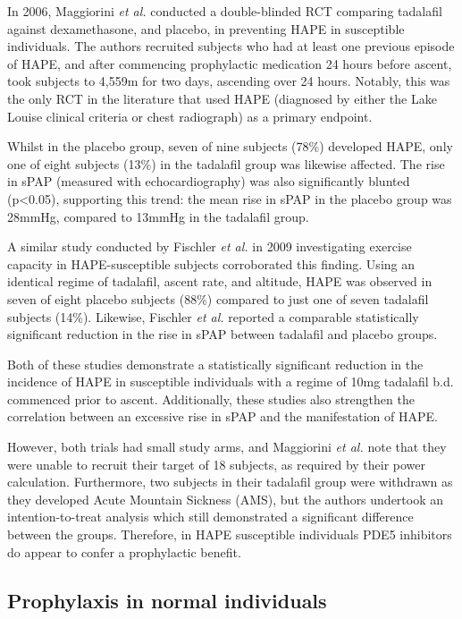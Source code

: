 \documentclass[12pt,a4paper]{article}
\begin{document}
In 2006, Maggiorini \emph{et al.} conducted a double-blinded RCT comparing tadalafil against dexamethasone, and placebo, in preventing HAPE in susceptible individuals.\cite{Maggiorini:2006kz} The authors recruited subjects who had at least one previous episode of HAPE, and after commencing prophylactic medication 24 hours before ascent, took subjects to 4,559m for two days, ascending over 24 hours. Notably, this was the only RCT in the literature that used HAPE (diagnosed by either the Lake Louise clinical criteria\cite{Sutton:1991wx} or chest radiograph) as a primary endpoint.

Whilst in the placebo group, seven of nine subjects (78\%) developed HAPE, only one of eight subjects (13\%) in the tadalafil group was likewise affected. The rise in sPAP (measured with echocardiography) was also significantly blunted (p<0.05), supporting this trend: the mean rise in sPAP in the placebo group was 28mmHg, compared to 13mmHg in the tadalafil group.\cite{Maggiorini:2006kz}

A similar study conducted by Fischler \emph{et al.} in 2009 investigating exercise capacity in HAPE-susceptible subjects corroborated this finding. Using an identical regime of tadalafil, ascent rate, and altitude, HAPE was observed in seven of eight placebo subjects (88\%) compared to just one of seven tadalafil subjects (14\%). Likewise, Fischler \emph{et al.} reported a comparable statistically significant reduction in the rise in sPAP between tadalafil and placebo groups.\cite{Fischler:2009ce}

Both of these studies demonstrate a statistically significant reduction in the incidence of HAPE in susceptible individuals with a regime of 10mg tadalafil b.d. commenced prior to ascent. Additionally, these studies also strengthen the correlation between an excessive rise in sPAP and the manifestation of HAPE.

However, both trials had small study arms, and Maggiorini \emph{et al.} note that they were unable to recruit their target of 18 subjects, as required by their power calculation. Furthermore, two subjects in their tadalafil group were withdrawn as they developed Acute Mountain Sickness (AMS), but the authors undertook an intention-to-treat analysis which still demonstrated a significant difference between the groups. Therefore, in HAPE susceptible individuals PDE5 inhibitors do appear to confer a prophylactic benefit.

\subsection*{Prophylaxis in normal individuals}
\end{document}
